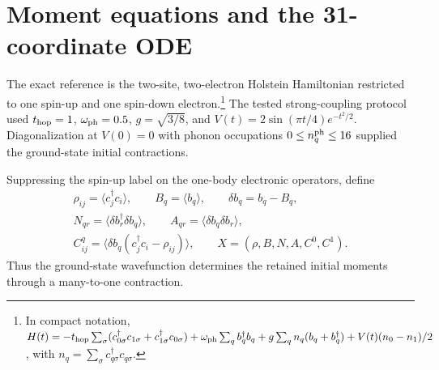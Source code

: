 \documentclass[10pt,twocolumn]{article}
\begin{document}
\section{Moment equations and the 31-coordinate ODE}

The exact reference is the two-site, two-electron Holstein Hamiltonian
restricted to one spin-up and one spin-down electron.\footnote{In compact
notation, \(H(t)=-t_{\rm hop}\sum_\sigma(c_{0\sigma}^\dagger
c_{1\sigma}+c_{1\sigma}^\dagger c_{0\sigma})+
\omega_{\rm ph}\sum_q b_q^\dagger b_q+g\sum_q n_q(b_q+b_q^\dagger)
+V(t)(n_0-n_1)/2\), with \(n_q=\sum_\sigma c_{q\sigma}^\dagger
c_{q\sigma}\).}
The tested
strong-coupling protocol used
$t_{\rm hop}=1$, $\omega_{\rm ph}=0.5$, $g=\sqrt{3/8}$, and
$V(t)=2\sin(\pi t/4)e^{-t^2/2}$.  Diagonalization at $V(0)=0$ with
phonon occupations $0\leq n_q^{\rm ph}\leq16$ supplied the ground-state
initial contractions.

Suppressing the spin-up label on the one-body electronic operators, define
\begin{equation}
\begin{gathered}
\rho_{ij}=\langle c_j^\dagger c_i\rangle,
\qquad B_q=\langle b_q\rangle,
\qquad \delta b_q=b_q-B_q,\\
N_{qr}=\langle\delta b_r^\dagger\delta b_q\rangle,
\qquad A_{qr}=\langle\delta b_q\delta b_r\rangle,\\
C^q_{ij}=\langle\delta b_q(c_j^\dagger c_i-\rho_{ij})\rangle,
\qquad X=(\rho,B,N,A,C^0,C^1).
\end{gathered}
\label{eq:moments}
\end{equation}
Thus the ground-state wavefunction determines the retained initial moments
through a many-to-one contraction.
\end{document}
